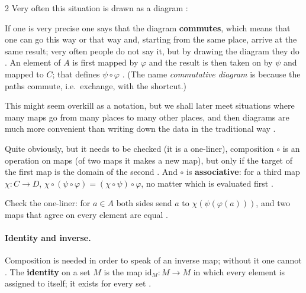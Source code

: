 \begin{paracol}{2}
Very often this situation is drawn as a diagram :
\begin{nfigure}
\caption{A commutative diagram: going along $\varphi$ and then $\psi$, or directly along $\psi\circ\varphi$, gives the
same result .}\label{fig:cl-diagram}
\end{nfigure}
If one is very precise one says that the diagram \textbf{commutes}, which means that one can go this way or that way and,
starting from the same place, arrive at the same result; very often people do not say it, but by drawing the diagram
they do . An element of $A$ is first mapped by $\varphi$ and the result is then taken on by $\psi$ and
mapped to $C$; that defines $\psi\circ\varphi$ . (The name \emph{commutative diagram} is because the paths
commute, i.e.\ exchange, with the shortcut.)

This might seem overkill as a notation, but we shall later meet situations where many maps go from many places to many
other places, and then diagrams are much more convenient than writing down the data in the traditional way
.

Quite obviously, but it needs to be checked (it is a one-liner), composition $\circ$ is an operation on maps (of two maps
it makes a new map), but only if the target of the first map is the domain of the second .
And $\circ$ is \textbf{associative}: for a third map $\chi\colon C\to D$, $\chi\circ(\psi\circ\varphi)=(\chi\circ\psi)\circ\varphi$,
no matter which is evaluated first .

\begin{exercise}\label{ex:cl-assoc}
Check the one-liner: for $a\in A$ both sides send $a$ to $\chi(\psi(\varphi(a)))$, and two maps that agree on every
element are equal .
\end{exercise}

\paragraph{Identity and inverse.} Composition is needed in order to speak of an inverse map; without it one cannot
. The \textbf{identity} on a set $M$ is the map $\mathrm{id}_M\colon M\to M$ in which every element is
assigned to itself; it exists for every set .


\end{paracol}
